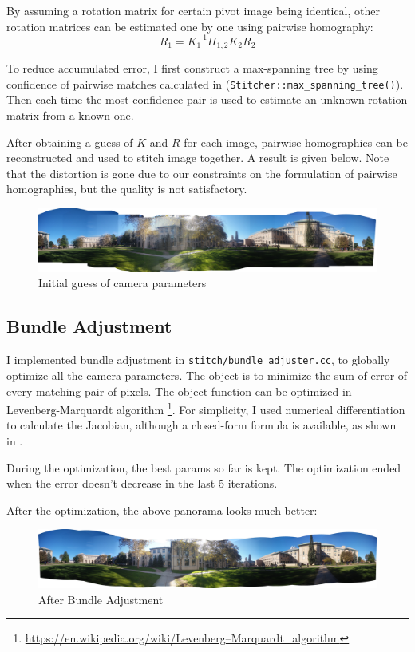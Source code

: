 By assuming a rotation matrix for certain pivot image being identical,
other rotation matrices
can be estimated one by one using pairwise homography:
\[ R_1 = K_1^{-1}H_{1,2}K_2R_2\]

To reduce accumulated error,
I first construct a max-spanning tree by using
confidence of pairwise matches calculated in  (\verb|Stitcher::max_spanning_tree()|).
Then each time the most confidence pair is used to estimate
an unknown rotation matrix from a known one.

After obtaining a guess of $K$ and $R$ for each image,
pairwise homographies can be reconstructed and used to
stitch image together. A result is given below. Note that
the distortion is gone due to our constraints on the formulation
of pairwise homographies, but the quality is not satisfactory.
\begin{figure}[H]
  \centering
  \includegraphics[width=\textwidth]{res/initial_camera.jpg}
  \caption{Initial guess of camera parameters}
\end{figure}

\subsection{Bundle Adjustment}

I implemented bundle adjustment in \verb|stitch/bundle_adjuster.cc|,
to globally optimize all the camera parameters.
The object is to minimize the sum of error of every matching pair of pixels.
The object function can be optimized in Levenberg-Marquardt algorithm
\footnote{\url{https://en.wikipedia.org/wiki/Levenberg–Marquardt_algorithm}}.
For simplicity, I used numerical differentiation to calculate
the Jacobian, although a closed-form formula is available,
as shown in \cite{panoramic-sift}.

During the optimization, the best params so far is kept.
The optimization ended when the error doesn't decrease
in the last 5 iterations.

After the optimization, the above panorama looks much better:
\begin{figure}[H]
  \centering
  \includegraphics[width=\textwidth]{res/after-ba.jpg}
  \caption{After Bundle Adjustment}
\end{figure}

